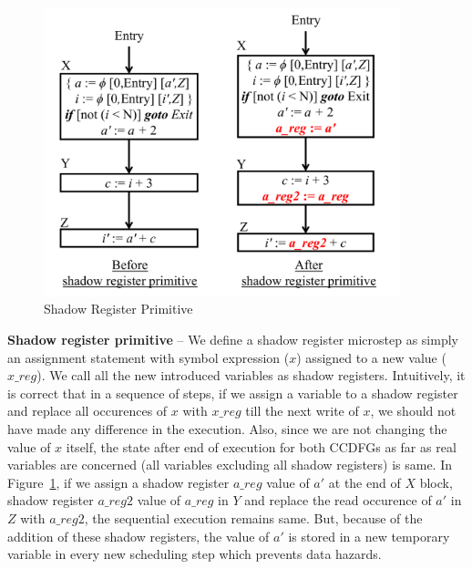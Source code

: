 \begin{figure}[t!]
\begin{center}
\includegraphics[height=3.3in]{fig-proposal/shadow-reg-primitive}
\end{center}
\caption{Shadow Register Primitive}
\label{fig:primitives1}
\end{figure}

{\textbf {Shadow register primitive}} -- We define a shadow register microstep as simply an assignment
statement with symbol expression ($x$) assigned to a new value ($x\_reg$). We call all the new introduced variables as shadow registers. Intuitively, it is correct that in a
sequence of steps, if we assign a variable to a shadow register and replace all occurences of $x$ with $x\_reg$
till the next write of $x$, we should
not have made any difference in the execution. Also, since we are not changing the value of $x$ itself,
 the state after end of execution for both CCDFGs as far as real variables are concerned (all variables
 excluding all shadow registers) is same. In Figure~\ref{fig:primitives1}, if we assign a shadow register
 $a\_reg$ value of $a'$ at the end of $X$ block, shadow register $a\_reg2$ value of $a\_reg$ in $Y$ and replace the read occurence of $a'$ in $Z$ with $a\_reg2$, the sequential execution remains same.
But, because of the addition of these shadow registers, the value of $a'$ is stored in a new temporary variable in every new scheduling step which prevents data hazards.

